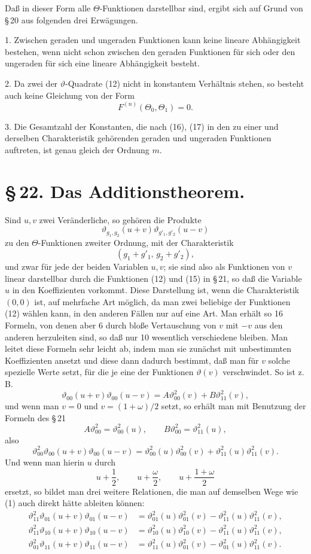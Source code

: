 \documentclass[11pt]{article}
\providecommand{\tht}{\vartheta}
\begin{document}
Daß in dieser Form alle $\Theta$-Funktionen darstellbar sind, ergibt sich auf Grund von \S\,20 aus folgenden drei Erwägungen.

1. Zwischen geraden und ungeraden Funktionen kann keine lineare Abhängigkeit bestehen, wenn nicht schon zwischen den geraden Funktionen für sich oder den ungeraden für sich eine lineare Abhängigkeit besteht.

2. Da zwei der $\vartheta$-Quadrate (12) nicht in konstantem Verhältnis stehen, so besteht auch keine Gleichung von der Form
\[
F^{(n)}(\Theta_0,\Theta_1)=0.
\]

3. Die Gesamtzahl der Konstanten, die nach (16), (17) in den zu einer und derselben Charakteristik gehörenden geraden und ungeraden Funktionen auftreten, ist genau gleich der Ordnung $m$.


\section*{\S\,22. Das Additionstheorem.}

Sind $u,v$ zwei Veränderliche, so gehören die Produkte
\[
\tht_{g_1,g_2}(u+v)\tht_{g'_1,g'_2}(u-v)
\]
zu den $\Theta$-Funktionen zweiter Ordnung, mit der Charakteristik
\[
(g_1+g'_1,\,g_2+g'_2),
\]
und zwar für jede der beiden Variablen $u,v$; sie sind also als Funktionen von $v$ linear darstellbar durch die Funktionen (12) und (15) in \S\,21, so daß die Variable $u$ in den Koeffizienten vorkommt. Diese Darstellung ist, wenn die Charakteristik $(0,0)$ ist, auf mehrfache Art möglich, da man zwei beliebige der Funktionen (12) wählen kann, in den anderen Fällen nur auf eine Art. Man erhält so 16 Formeln, von denen aber 6 durch bloße Vertauschung von $v$ mit $-v$ aus den anderen herzuleiten sind, so daß nur 10 wesentlich verschiedene bleiben. Man leitet diese Formeln sehr leicht ab, indem man sie zunächst mit unbestimmten Koeffizienten ansetzt und diese dann dadurch bestimmt, daß man für $v$ solche spezielle Werte setzt, für die je eine der Funktionen $\tht(v)$ verschwindet. So ist z. B.
\[
\tht_{00}(u+v)\tht_{00}(u-v)=A\tht_{00}^{2}(v)+B\tht_{11}^{2}(v),
\]
und wenn man $v=0$ und $v=(1+\omega)/2$ setzt, so erhält man mit Benutzung der Formeln des \S\,21
\[
A\tht_{00}^{2}=\tht_{00}^{2}(u),\qquad B\tht_{00}^{2}=\tht_{11}^{2}(u),
\]
also
\begin{equation}
\tht_{00}^{2}\tht_{00}(u+v)\tht_{00}(u-v)
=\tht_{00}^{2}(u)\tht_{00}^{2}(v)+\tht_{11}^{2}(u)\tht_{11}^{2}(v).
\tag{1}
\end{equation}
Und wenn man hierin $u$ durch
\[
u+\frac12,\qquad u+\frac{\omega}{2},\qquad u+\frac{1+\omega}{2}
\]
ersetzt, so bildet man drei weitere Relationen, die man auf demselben Wege wie (1) auch direkt hätte ableiten können:
\begin{align}
\tht_{11}^{2}\tht_{01}(u+v)\tht_{01}(u-v)
&=\tht_{01}^{2}(u)\tht_{01}^{2}(v)-\tht_{11}^{2}(u)\tht_{11}^{2}(v), \tag{2}\\
\tht_{11}^{2}\tht_{10}(u+v)\tht_{10}(u-v)
&=\tht_{10}^{2}(u)\tht_{10}^{2}(v)-\tht_{11}^{2}(u)\tht_{11}^{2}(v), \tag{3}\\
\tht_{01}^{2}\tht_{11}(u+v)\tht_{11}(u-v)
&=\tht_{11}^{2}(u)\tht_{01}^{2}(v)-\tht_{01}^{2}(u)\tht_{11}^{2}(v). \tag{4}
\end{align}
\end{document}
